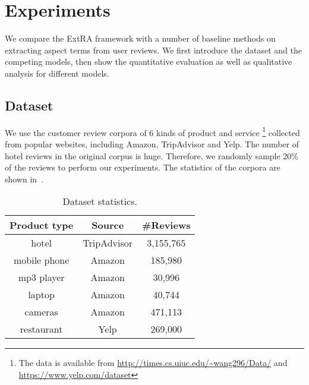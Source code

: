 \section{Experiments}
\label{sec:experiments}
We compare the ExtRA framework with a number of 
baseline methods on extracting aspect terms from user reviews. 
We first introduce the dataset and the competing models, then
show the quantitative evaluation as well as qualitative analysis for
different models.

\subsection{Dataset}
\label{sec:dataset}
We use the customer review corpora of 6 kinds of product and service
\footnote{The data is available from
\url{http://times.cs.uiuc.edu/~wang296/Data/} and 
\url{https://www.yelp.com/dataset}} collected from popular websites, 
including Amazon, TripAdvisor and Yelp. 
The number of hotel reviews \cite{Wang2011LearningOD} in the original
corpus is huge. 
Therefore, we randomly sample 20\% of the reviews to perform our experiments.
The statistics of the corpora are shown in~.
\begin{table}[th]
\small
\centering
\vspace{-0.5cm}
\caption{Dataset statistics.} 
\label{table:dataset}
\vspace{-0.2cm}
\begin{tabular}{|c|c|c|}
\hline
\textbf{Product type} & \textbf{Source} & \textbf{\#Reviews} \\ \hline \hline
hotel        & TripAdvisor & 3,155,765   \\\hline
mobile phone & Amazon & 185,980  \\\hline
mp3 player   & Amazon & 30,996   \\\hline
laptop       & Amazon & 40,744   \\\hline
cameras & Amazon & 471,113  \\\hline
restaurant   & Yelp & 269,000   \\\hline
\end{tabular}
\vspace{-0.2cm}
\end{table}

